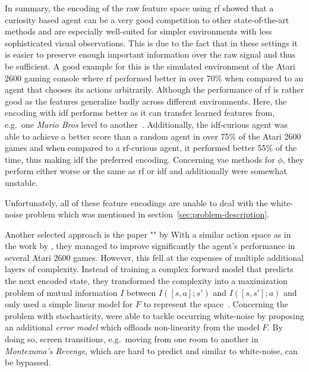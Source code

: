 \documentclass[draft,final]{vutinfth} %
\begin{document}

    In summary, the encoding of the raw feature space using \gls{rf} showed that a curiosity based agent can be a very good competition to other state-of-the-art methods and are especially well-suited for simpler environments with less sophisticated visual observations.
    This is due to the fact that in these settings it is easier to preserve enough important information over the raw signal and thus be sufficient.
    A good example for this is the simulated environment of the Atari 2600 gaming console where \gls{rf} performed better in over 70\% when compared to an agent that chooses its actions arbitrarily.
    Although the performance of \gls{rf} is rather good as the features generalize badly across different environments.
    Here, the encoding with \gls{idf} performs better as it can transfer learned features from, e.g.\ one \textit{Mario Bros} level to another~\citep{burda_large-scale_2018-1}.
    Additionally, the \gls{idf}-curious agent was able to achieve a better score than a random agent in over 75\% of the Atari 2600 games and when compared to a \gls{rf}-curious agent, it performed better 55\% of the time, thus making \gls{idf} the preferred encoding.
    Concerning \gls{vae} methods for $\phi$, they perform either worse or the same as \gls{rf} or \gls{idf} and additionally were somewhat unstable.

    Unfortunately, all of these feature encodings are unable to deal with the white-noise problem which was mentioned in section~\ref{sec:problem-description}.

    Another selected approach is the paper "" by \citeauthor{kim_emi_2019}
    With a similar action space as in the work by \citeauthor{pathak_curiosity-driven_2017-1}, they managed to improve significantly the agent's performance in several Atari 2600 games.
    However, this fell at the expenses of multiple additional layers of complexity.
    Instead of training a complex forward model that predicts the next encoded state, they transformed the complexity into a maximization problem of mutual information $I$ between $I([s,a];s')$ and $I([s,s'];a)$ and only used a simple linear model for $F$ to represent the space~\citep{aubret_survey_2019}.
    Concerning the problem with stochasticity, \citeauthor{kim_emi_2019} were able to tackle occurring white-noise by proposing an additional \textit{error model} which offloads non-linearity from the model $F$.
    By doing so, screen transitions, e.g.\ moving from one room to another in \textit{Montezuma's Revenge}, which are hard to predict and similar to white-noise, can be bypassed.
\end{document}
